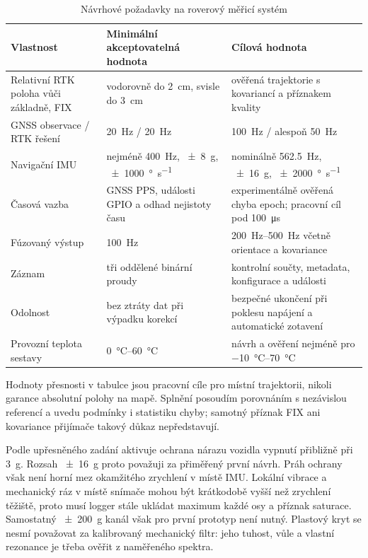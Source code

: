 \begin{table}[htbp]
  \centering
  \small
  \caption{Návrhové požadavky na roverový měřicí systém}
  \label{tab:pozadavky}
  \begin{tabularx}{\textwidth}{@{}L{0.29\textwidth}L{0.30\textwidth}Y@{}}
    \toprule
    Vlastnost & Minimální akceptovatelná hodnota & Cílová hodnota \\
    \midrule
    Relativní RTK poloha vůči základně, FIX
      & vodorovně do \SI{2}{cm}, svisle do \SI{3}{cm}
      & ověřená trajektorie s kovariancí a příznakem kvality \\
    GNSS observace / RTK řešení
      & \SI{20}{Hz} / \SI{20}{Hz}
      & \SI{100}{Hz} / alespoň \SI{50}{Hz} \\
    Navigační IMU
      & nejméně \SI{400}{Hz}, \SI{\pm8}{g}, \SI{\pm1000}{\degree\per\second}
      & nominálně \SI{562.5}{Hz}, \SI{\pm16}{g}, \SI{\pm2000}{\degree\per\second} \\
    Časová vazba
      & GNSS PPS, události GPIO a odhad nejistoty času
      & experimentálně ověřená chyba epoch; pracovní cíl pod \SI{100}{\micro\second} \\
    Fúzovaný výstup
      & \SI{100}{Hz}
      & \SIrange{200}{500}{Hz} včetně orientace a kovariance \\
    Záznam
      & tři oddělené binární proudy
      & kontrolní součty, metadata, konfigurace a události \\
    Odolnost
      & bez ztráty dat při výpadku korekcí
      & bezpečné ukončení při poklesu napájení a automatické zotavení \\
    Provozní teplota sestavy
      & \SIrange{0}{60}{\degreeCelsius}
      & návrh a ověření nejméně pro \SIrange{-10}{70}{\degreeCelsius} \\
    \bottomrule
  \end{tabularx}
\end{table}

Hodnoty přesnosti v tabulce jsou pracovní cíle pro místní trajektorii,
nikoli garance absolutní polohy na mapě. Splnění posoudím porovnáním
s nezávislou referencí a uvedu podmínky i statistiku chyby; samotný příznak
FIX ani kovariance přijímače takový důkaz nepředstavují.

Podle upřesněného zadání aktivuje ochrana nárazu vozidla vypnutí přibližně při
\SI{3}{g}. Rozsah \SI{\pm16}{g} proto považuji za přiměřený první návrh.
Práh ochrany však není horní mez okamžitého zrychlení v místě IMU. Lokální vibrace a mechanický ráz v místě snímače mohou
být krátkodobě vyšší než zrychlení těžiště, proto musí logger stále ukládat
maximum každé osy a příznak saturace. Samostatný \SI{\pm200}{g} kanál však pro
první prototyp není nutný. Plastový kryt se nesmí považovat za kalibrovaný
mechanický filtr: jeho tuhost, vůle a vlastní rezonance je třeba ověřit z
naměřeného spektra.

